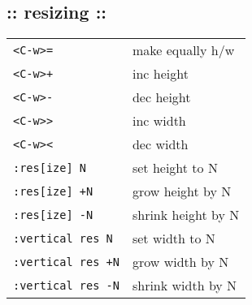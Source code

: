\subsection{:: resizing ::}
\begin{tabular}{@{}ll@{}}
    \verb!<C-w>=!               & make equally h/w \\
    \verb!<C-w>+!               & inc height \\
    \verb!<C-w>-!               & dec height \\
    \verb!<C-w>>!               & inc width \\
    \verb!<C-w><!               & dec width \\
    \verb!:res[ize] N!          & set height to N \\
    \verb!:res[ize] +N!         & grow height by N \\
    \verb!:res[ize] -N!         & shrink height by N \\
    \verb!:vertical res N!      & set width to N \\
    \verb!:vertical res +N!     & grow width by N \\
    \verb!:vertical res -N!     & shrink width by N \\
\end{tabular}

